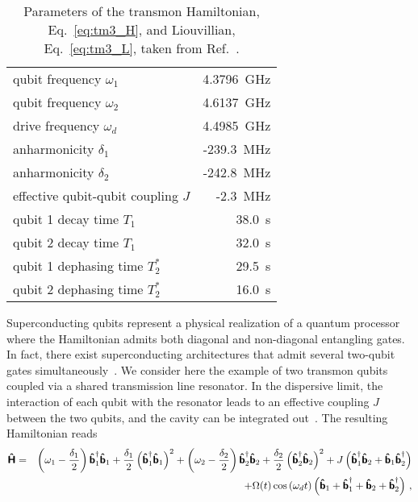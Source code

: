 \begin{table}[tb]
  \centering
 \begin{tabular}{|l|r|}\hline
  qubit frequency  $\omega_1$          & 4.3796~GHz \\ %
  qubit frequency  $\omega_2$          & 4.6137~GHz \\ %
  drive frequency  $\omega_d$          & 4.4985~GHz \\ \hline
  anharmonicity    $\delta_1$          & -239.3~MHz \\ %
  anharmonicity    $\delta_2$          & -242.8~MHz \\ \hline
  effective qubit-qubit coupling $J$   &   -2.3~MHz \\ \hline
  qubit 1 decay time $T_1$             &   38.0~\micro{}s \\
  qubit 2 decay time $T_1$             &   32.0~\micro{}s \\ \hline
  qubit 1 dephasing time $T^{*}_2$     &   29.5~\micro{}s \\
  qubit 2 dephasing time $T^{*}_2$     &   16.0~\micro{}s \\
  \hline
 \end{tabular}
  \caption{Parameters of the transmon Hamiltonian,
    Eq.~\eqref{eq:tm3_H}, and Liouvillian, Eq.~\eqref{eq:tm3_L},
    taken from Ref.~\cite{PolettoPRL12}.}
  \label{tab:tm3_params}
\end{table}
Superconducting qubits represent a physical realization of a quantum
processor where the Hamiltonian admits both diagonal and non-diagonal
entangling gates. In fact, there exist superconducting
architectures that admit several two-qubit
gates simultaneously~\cite{ChowPRL11,PolettoPRL12}.
We consider here the example of two transmon
qubits coupled via a shared transmission line resonator. In the dispersive
limit, the interaction of each qubit with the resonator leads to an effective
coupling $J$ between the two qubits, and the cavity can be integrated
out~\cite{PolettoPRL12}. The resulting Hamiltonian reads
\begin{eqnarray}
  \label{eq:tm3_H}
  \boldsymbol{\mathsf{\hat{H}}}
  &=& \left(\omega_{1} - \frac{\delta_1}{2} \right) \boldsymbol{\mathsf{\hat{b}}}_1^{\dagger} \boldsymbol{\mathsf{\hat{b}}}_1
  + \frac{\delta_1}{2} \left( \boldsymbol{\mathsf{\hat{b}}}_1^{\dagger} \boldsymbol{\mathsf{\hat{b}}}_1 \right)^2
  + \left(\omega_{2} - \frac{\delta_2}{2} \right) \boldsymbol{\mathsf{\hat{b}}}_2^{\dagger} \boldsymbol{\mathsf{\hat{b}}}_2
  + \frac{\delta_2}{2} \left( \boldsymbol{\mathsf{\hat{b}}}_2^{\dagger} \boldsymbol{\mathsf{\hat{b}}}_2 \right)^2
  + J \left(\boldsymbol{\mathsf{\hat{b}}}_1^{\dagger} \boldsymbol{\mathsf{\hat{b}}}_2 +  \boldsymbol{\mathsf{\hat{b}}}_1 \boldsymbol{\mathsf{\hat{b}}}_2^{\dagger}
  \right)
  \\ &&
  + \Omega(t) \cos \left( \omega_d t \right)
     \left( \boldsymbol{\mathsf{\hat{b}}}_1 + \boldsymbol{\mathsf{\hat{b}}}_1^{\dagger}
          + \boldsymbol{\mathsf{\hat{b}}}_2 + \boldsymbol{\mathsf{\hat{b}}}_2^{\dagger}
     \right)\,, \nonumber
\end{eqnarray}
